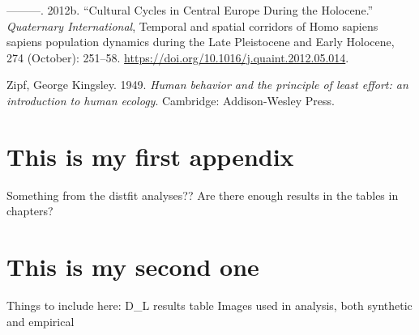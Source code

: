 \documentclass[
  12pt,
  a4paper, twoside]{book}
\newlength{\cslhangindent}
\newlength{\cslentryspacingunit} %
\newenvironment{CSLReferences}[2] %
 {%
  \setlength{\parindent}{0pt}
  \ifodd #1
  \let\oldpar\par
  \def\par{\hangindent=\cslhangindent\oldpar}
  \fi
  \setlength{\parskip}{#2\cslentryspacingunit}
 }%
 {}
\begin{document}
\begin{CSLReferences}{1}{0}
\leavevmode{}%
---------. 2012b. {``Cultural Cycles in {Central Europe} During the {Holocene}.''} \emph{Quaternary International}, Temporal and spatial corridors of {Homo} sapiens sapiens population dynamics during the {Late Pleistocene} and {Early Holocene}, 274 (October): 251--58. \url{https://doi.org/10.1016/j.quaint.2012.05.014}.

\leavevmode{}%
Zipf, George Kingsley. 1949. \emph{Human behavior and the principle of least effort: an introduction to human ecology}. Cambridge: Addison-Wesley Press.

\end{CSLReferences}

\hypertarget{appendix-appendix}{%
\appendix {}}


\hypertarget{this-is-my-first-appendix}{%
\chapter{This is my first appendix}\label{this-is-my-first-appendix}}

Something from the distfit analyses??
Are there enough results in the tables in chapters?

\hypertarget{this-is-my-second-one}{%
\chapter{This is my second one}\label{this-is-my-second-one}}

Things to include here:
D\_L results table
Images used in analysis, both synthetic and empirical
\end{document}
